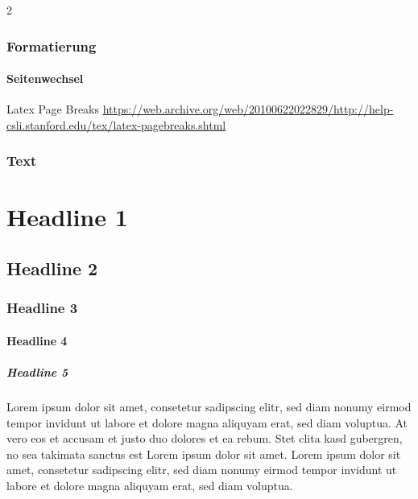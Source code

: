 \documentclass[
  twoside]{article}
\let\oldparagraph\paragraph
\renewcommand{\paragraph}[1]{\oldparagraph{#1}\mbox{}}
\let\oldsubparagraph\subparagraph
\renewcommand{\subparagraph}[1]{\oldsubparagraph{#1}\mbox{}}
\begin{document}
\begin {multicols}{2}
\hypertarget{formatierung}{%
\subsubsection{Formatierung}\label{formatierung}}

\hypertarget{seitenwechsel}{%
\paragraph{Seitenwechsel}\label{seitenwechsel}}

Latex Page Breaks
\url{https://web.archive.org/web/20100622022829/http://help-csli.stanford.edu/tex/latex-pagebreaks.shtml}

\hypertarget{text}{%
\subsubsection{Text}\label{text}}

\hypertarget{headline-1}{%
\section{Headline 1}\label{headline-1}}

\hypertarget{headline-2}{%
\subsection{Headline 2}\label{headline-2}}

\hypertarget{headline-3}{%
\subsubsection{Headline 3}\label{headline-3}}

\hypertarget{headline-4}{%
\paragraph{Headline 4}\label{headline-4}}

\hypertarget{headline-5}{%
\subparagraph{Headline 5}\label{headline-5}}

Lorem ipsum dolor sit amet, consetetur sadipscing elitr, sed diam nonumy
eirmod tempor invidunt ut labore et dolore magna aliquyam erat, sed diam
voluptua. At vero eos et accusam et justo duo dolores et ea rebum. Stet
clita kasd gubergren, no sea takimata sanctus est Lorem ipsum dolor sit
amet. Lorem ipsum dolor sit amet, consetetur sadipscing elitr, sed diam
nonumy eirmod tempor invidunt ut labore et dolore magna aliquyam erat,
sed diam voluptua.

\end {multicols}
\end{document}
